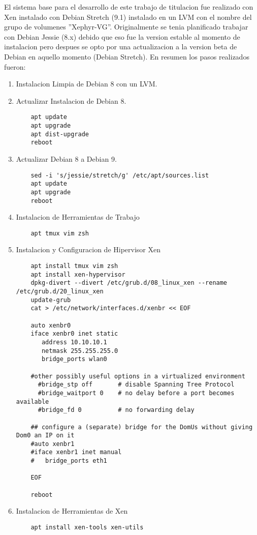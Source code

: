 El sistema base para el desarrollo de este trabajo de titulacion fue realizado con Xen instalado con Debian Stretch (9.1) instalado en un LVM con el nombre del grupo de volumenes ''Xephyr-VG''. Originalmente se tenia planificado trabajar con Debian Jessie (8.x) debido que eso fue la version estable al momento de instalacion pero despues se opto por una actualizacion a la version beta de Debian en aquello momento (Debian Stretch). En resumen los pasos realizados fueron:
\lstset{language=Bash}
\begin{enumerate}
	\item Instalacion Limpia de Debian 8 con un LVM.
    \item Actualizar Instalacion de Debian 8.
    	\begin{lstlisting}
    apt update
    apt upgrade
    apt dist-upgrade
    reboot
        \end{lstlisting}
    \item Actualizar Debian 8 a Debian 9.
        \begin{lstlisting}
    sed -i 's/jessie/stretch/g' /etc/apt/sources.list
    apt update
    apt upgrade
    reboot
        \end{lstlisting}
    \item Instalacion de Herramientas de Trabajo
        \begin{lstlisting}
    apt tmux vim zsh
        \end{lstlisting}
    \item Instalacion y Configuracion de Hipervisor Xen
		\begin{lstlisting}
    apt install tmux vim zsh
    apt install xen-hypervisor
    dpkg-divert --divert /etc/grub.d/08_linux_xen --rename /etc/grub.d/20_linux_xen
    update-grub
    cat > /etc/network/interfaces.d/xenbr << EOF

    auto xenbr0
    iface xenbr0 inet static
       address 10.10.10.1
       netmask 255.255.255.0
       bridge_ports wlan0

    #other possibly useful options in a virtualized environment
      #bridge_stp off       # disable Spanning Tree Protocol
      #bridge_waitport 0    # no delay before a port becomes available
      #bridge_fd 0          # no forwarding delay

    ## configure a (separate) bridge for the DomUs without giving Dom0 an IP on it
    #auto xenbr1
    #iface xenbr1 inet manual
    #   bridge_ports eth1

    EOF

    reboot
		\end{lstlisting}
	\item Instalacion de Herramientas de Xen
		\begin{lstlisting}
	apt install xen-tools xen-utils
		\end{lstlisting}
\end{enumerate}

